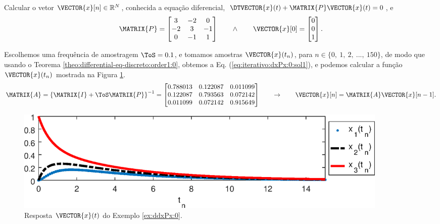 \begin{example}
\label{ex:iterativo:dxPx:0}
Calcular o vetor $\VECTOR{x}[n] \in \mathbb{R}^{N}$,
conhecida a equação diferencial, $\DTVECTOR{x}(t) + \MATRIX{P} \VECTOR{x}(t)=0$, e
\begin{equation}
\MATRIX{P}=
\begin{bmatrix}
3 & -2 & 0\\
-2 & 3 & -1\\
0 & -1 & 1
\end{bmatrix}
\qquad \wedge \qquad
\VECTOR{x}[0]=
\begin{bmatrix}
0\\
0\\
1
\end{bmatrix}.
\end{equation}
\vspace{-6pt}
\end{example}


\begin{SolutionT}
\label{ex:iterativo:dxPx:0:sol1}
Escolhemos uma frequência de amostragem $\ToS=0.1$, e
tomamos amostras $\VECTOR{x}(t_n)$, para $n \in \{0,~ 1,~ 2,~ ...,~ 150\}$, 
de modo que usando o Teorema \ref{theo:differential-eq-discreto:order1:0}, 
obtemos a Eq. (\ref{eq:iterativo:dxPx:0:sol1}),
e podemos calcular a função $\VECTOR{x}(t_n)$ mostrada na Figura \ref{fig:ex:iterativo:dxPx:0}.
\begin{equation}\label{eq:iterativo:dxPx:0:sol1}
\MATRIX{A}=
\left\{\MATRIX{I} + \ToS \MATRIX{P}\right\}^{-1}=
\begin{bmatrix}
   0.788013 & 0.122087 & 0.011099 \\
   0.122087 & 0.793563 & 0.072142 \\
   0.011099 & 0.072142 & 0.915649 
\end{bmatrix}
\qquad \rightarrow \qquad
\VECTOR{x}[n]=\MATRIX{A} \VECTOR{x}[n-1].
\end{equation}

\end{SolutionT}
     \begin{figure}[!h]
         \centering
         \includegraphics[width=0.89\textwidth]{chapters/differential-eq-discreto/mfiles/primeiroorder/primeirooder1.eps}
         \caption{Resposta $\VECTOR{x}(t)$ do Exemplo \ref{ex:ddxPx:0}.}
         \label{fig:ex:iterativo:dxPx:0}
     \end{figure}
